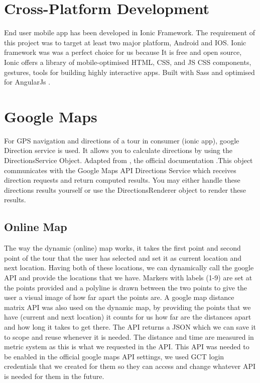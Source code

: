 		\section{Cross-Platform Development}
		End user mobile app has been developed in Ionic Framework.  The requirement of this project was to target at least two major platform, Android and IOS. Ionic framework was was a perfect choice for us because It is free and open source, Ionic offers a library of mobile-optimised HTML, CSS, and JS CSS components, gestures, tools for building highly interactive apps. Built with Sass and optimised for AngularJs \cite{expressRef}.
		
		\section{Google Maps}
		For GPS navigation and directions of a tour in consumer (ionic app), google Direction service is used. It allows you to calculate directions by using the DirectionsService Object. Adapted from \cite{GoogleMapDirection}, the official documentation .This object communicates with the Google Maps API Directions Service which receives direction requests and return computed results. You may either handle these directions results yourself or use the DirectionsRenderer object to render these results. 
		
		\subsection{Online Map}
		
		The way the dynamic (online) map works, it takes the first point and second point of the tour that the user has selected and set it as current location and next location. Having both of these locations, we can dynamically call the google API and provide the locations that we have. Markers with labels (1-9) are set at the points provided and a polyline is drawn between the two points to give the user a visual image of how far apart the points are. A google map distance matrix API was also used on the dynamic map, by providing the points that we have (current and next location) it counts for us how far are the distances apart and how long it takes to get there. The API returns a JSON which we can save it to scope and reuse whenever it is needed. The distance and time are measured in metric system as this is what we requested in the API. This API was needed to be enabled in the official google maps API settings, we used GCT login credentials that we created for them so they can access and change whatever API is needed for them in the future.
		
